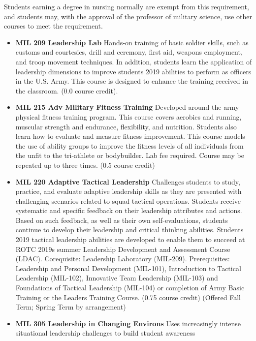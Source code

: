 \documentclass[
  letterpaper,
]{scrbook}
\providecommand{\tightlist}{%
  \setlength{\itemsep}{0pt}\setlength{\parskip}{0pt}}
\begin{document}
Students earning a degree in nursing normally are exempt from this
requirement, and students may, with the approval of the professor of
military science, use other courses to meet the requirement.

\begin{itemize}
\tightlist
\item
  \textbf{MIL 209 Leadership Lab} Hands-on training of basic soldier
  skills, such as customs and courtesies, drill and ceremony, first aid,
  weapons employment, and troop movement techniques. In addition,
  students learn the application of leadership dimensions to improve
  students 2019 abilities to perform as officers in the U.S. Army. This
  course is designed to enhance the training received in the classroom.
  (0.0 course credit).
\item
  \textbf{MIL 215 Adv Military Fitness Training} Developed around the
  army physical fitness training program. This course covers aerobics
  and running, muscular strength and endurance, flexibility, and
  nutrition. Students also learn how to evaluate and measure fitness
  improvement. This course models the use of ability groups to improve
  the fitness levels of all individuals from the unfit to the
  tri-athlete or bodybuilder. Lab fee required. Course may be repeated
  up to three times. (0.5 course credit)
\item
  \textbf{MIL 220 Adaptive Tactical Leadership} Challenges students to
  study, practice, and evaluate adaptive leadership skills as they are
  presented with challenging scenarios related to squad tactical
  operations. Students receive systematic and specific feedback on their
  leadership attributes and actions. Based on such feedback, as well as
  their own self-evaluations, students continue to develop their
  leadership and critical thinking abilities. Students 2019 tactical
  leadership abilities are developed to enable them to succeed at ROTC
  2019s summer Leadership Development and Assessment Course (LDAC).
  Corequisite: Leadership Laboratory (MIL-209). Prerequisites:
  Leadership and Personal Development (MIL-101), Introduction to
  Tactical Leadership (MIL-102), Innovative Team Leadership (MIL-103)
  and Foundations of Tactical Leadership (MIL-104) or completion of Army
  Basic Training or the Leaders Training Course. (0.75 course credit)
  (Offered Fall Term; Spring Term by arrangement)
\item
  \textbf{MIL 305 Leadership in Changing Environs} Uses increasingly
  intense situational leadership challenges to build student awareness

\end{itemize}
\end{document}
